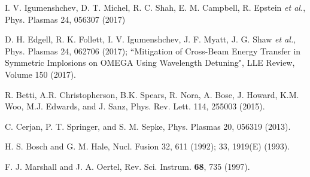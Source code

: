 \documentclass[aip,reprint]{revtex4-1}
\begin{document}
\begin{thebibliography}{5}
I. V. Igumenshchev, D. T. Michel, R. C. Shah, E. M. Campbell, R. Epstein \textit{et al.}, Phys. Plasmas 24, 056307 (2017)

D. H. Edgell, R. K. Follett, I. V. Igumenshchev, J. F. Myatt, J. G. Shaw \textit{et al.}, Phys. Plasmas 24, 062706 (2017); ``Mitigation of Cross-Beam Energy Transfer in Symmetric Implosions on OMEGA Using Wavelength Detuning", LLE Review, Volume 150 (2017).

R. Betti, A.R. Christopherson, B.K. Spears, R. Nora, A. Bose, J. Howard, K.M. Woo, M.J. Edwards, and J. Sanz, Phys. Rev. Lett. 114, 255003 (2015).

C. Cerjan, P. T. Springer, and S. M. Sepke, Phys. Plasmas 20, 056319 (2013).

H. S. Bosch and G. M. Hale, Nucl. Fusion 32, 611 (1992); 33, 1919(E) (1993).

F. J. Marshall and J. A. Oertel, Rev. Sci. Instrum. \textbf{68}, 735 (1997).


\end{thebibliography}
%
%
%
\end{document}
